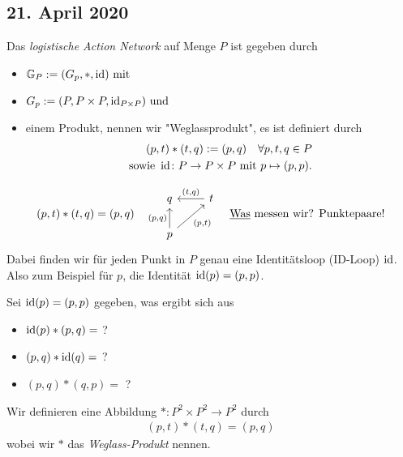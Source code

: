 \subsection*{21. April 2020}
\begin{definition}
    Das \emph{logistische Action Network} auf Menge $P$ ist gegeben durch
    \begin{itemize}
        \item $\mathbb{G}_P := (G_p, \ast, \operatorname{id}) \text{ mit }$
        \item $G_p := (P, P\times P, \operatorname{id}_{P\times P})\text{ und }$
        \item einem Produkt, nennen wir "Weglassprodukt", es ist definiert durch
        \begin{align*}
            (p,t)\ast (t,q) := (p,q) \quad \forall p,t,q \in P\\
            \text{sowie } \operatorname{id} \colon P \to P \times P \text{ mit } p \mapsto (p,p).
        \end{align*}
    \end{itemize}
\end{definition}
$$
        (p,t)\ast (t,q) = (p,q)\\ \quad
        \begin{tikzcd}[ampersand replacement=\&]
        q                                             \& t \arrow[l, "{(t,q)}"'] \\
        p \arrow[u, "{(p,q)}"] \arrow[ru, "{(p,t)}"'] \&      
    \end{tikzcd}\\ \quad\text{\emph{Was} messen wir? Punktepaare!}
$$
Dabei finden wir für jeden Punkt in $P$ genau eine Identitätsloop (ID-Loop) $\operatorname{id}$. Also zum Beispiel für $p$, die Identität $\operatorname{id}(p)=(p,p)$. 
\begin{problem}
    Sei $\operatorname{id}(p) = (p,p)$ gegeben, was ergibt sich aus
    \begin{itemize}
        \item $\operatorname{id}(p)\ast (p,q) =$ ? %
        \item $(p,q)\ast \operatorname{id}(q) =$ ? %
        \item $(p,q)\ast (q,p) =$ ? %
    \end{itemize}
\end{problem}
\begin{definition}
    Wir definieren eine Abbildung $\ast \colon P^2 \times P^2 \to P^2$ durch
    \begin{align*}
        (p,t)\ast (t,q) = (p,q)
    \end{align*}
    wobei wir $\ast$ das \emph{Weglass-Produkt} nennen.
\end{definition}
